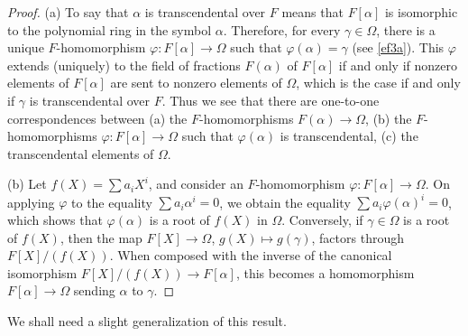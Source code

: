 \documentclass[a4paper,11pt,final,openany]{memoir}
\theoremstyle{nonumberplain}
\newtheorem{proof}{Proof.}
\begin{document}
\begin{proof}
(a) To say that $\alpha$ is transcendental over $F$ means that $F[\alpha]$ is
isomorphic to the polynomial ring in the symbol $\alpha$. Therefore, for every
$\gamma\in\Omega$, there is a unique $F$-homomorphism $\varphi\colon
F[\alpha]\rightarrow\Omega$ such that $\varphi(\alpha)=\gamma$ (see
\ref{ef3a}). This $\varphi$ extends (uniquely) to the field of fractions
$F(\alpha)$ of $F[\alpha]$ if and only if nonzero elements of $F[\alpha]$ are
sent to nonzero elements of $\Omega$, which is the case if and only if
$\gamma$ is transcendental over $F$. Thus we see that there are one-to-one
correspondences between (a) the $F$-homomorphisms $F(\alpha)\rightarrow\Omega
$, (b) the $F$-homomorphisms $\varphi\colon F[\alpha]\rightarrow\Omega$ such
that $\varphi(\alpha)$ is transcendental, (c) the transcendental elements of
$\Omega$.

(b) Let $f(X)=\sum a_{i}X^{i}$, and consider an $F$-homomorphism
$\varphi\colon F[\alpha]\rightarrow\Omega$. On applying $\varphi$ to the
equality $\sum a_{i}\alpha^{i}=0$, we obtain the equality $\sum a_{i}%
\varphi(\alpha)^{i}=0$, which shows that $\varphi(\alpha)$ is a root of $f(X)$
in $\Omega$. Conversely, if $\gamma\in\Omega$ is a root of $f(X)$, then the
map $F[X]\rightarrow\Omega$, $g(X)\mapsto g(\gamma)$, factors through
$F[X]/(f(X))$. When composed with the inverse of the canonical isomorphism
$F[X]/(f(X))\rightarrow F[\alpha]$, this becomes a homomorphism $F[\alpha
]\rightarrow\Omega$ sending $\alpha$ to $\gamma$.
\end{proof}

We shall need a slight generalization of this result.
\end{document}

